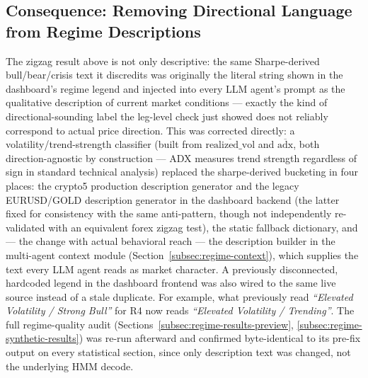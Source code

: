 \subsection{Consequence: Removing Directional Language from Regime Descriptions}
\label{subsec:regime-label-fix}

The zigzag result above is not only descriptive: the same Sharpe-derived bull/bear/crisis text it discredits was originally the literal string shown in the dashboard's regime legend and injected into every LLM agent's prompt as the qualitative description of current market conditions --- exactly the kind of directional-sounding label the leg-level check just showed does not reliably correspond to actual price direction. This was corrected directly: a volatility/trend-strength classifier (built from $\overline{\mathrm{realized\_vol}}$ and $\overline{\mathrm{adx}}$, both direction-agnostic by construction --- ADX measures trend strength regardless of sign in standard technical analysis) replaced the sharpe-derived bucketing in four places: the crypto5 production description generator and the legacy EURUSD/GOLD description generator in the dashboard backend (the latter fixed for consistency with the same anti-pattern, though not independently re-validated with an equivalent forex zigzag test), the static fallback dictionary, and --- the change with actual behavioral reach --- the description builder in the multi-agent context module (Section~\ref{subsec:regime-context}), which supplies the text every LLM agent reads as market character. A previously disconnected, hardcoded legend in the dashboard frontend was also wired to the same live source instead of a stale duplicate. For example, what previously read \emph{``Elevated Volatility / Strong Bull''} for R4 now reads \emph{``Elevated Volatility / Trending''}. The full regime-quality audit (Sections~\ref{subsec:regime-results-preview}, \ref{subsec:regime-synthetic-results}) was re-run afterward and confirmed byte-identical to its pre-fix output on every statistical section, since only description text was changed, not the underlying HMM decode.

